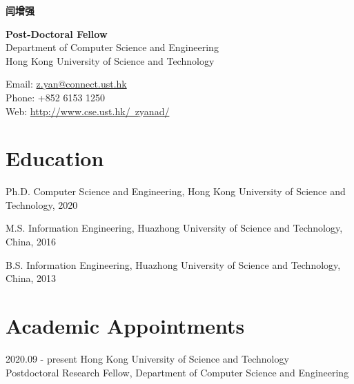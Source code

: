 \documentclass[12pt,letterpaper]{report}
\newcommand{\myname}{闫增强}
\newcommand{\namefont}[1]{{\normalfont\bfseries\Huge{#1}}}
\begin{document}
	\raggedright
	
	\namefont{\myname}
	
	\vspace{1em}
	\begin{minipage}[t]{0.6\textwidth}
		\textbf{Post-Doctoral Fellow}\\
		Department of Computer Science and Engineering \\
		Hong Kong University of Science and Technology
	\end{minipage}
	\begin{minipage}[t]{0.39\textwidth}
		Email: \href{mailto:z.yan@connect.ust.hk}{z.yan@connect.ust.hk} \\
		Phone: +852 6153 1250 \\
		Web: \href{http://www.cse.ust.hk/~zyanad/}{http://www.cse.ust.hk/~zyanad/}
	\end{minipage}
	\vspace{0.5em}
	
	
	
	\section{Education}
	
	\begin{tablist}
		
		\item[Ph.D.] \tab Computer Science and Engineering, Hong Kong University of Science and Technology, 2020
		
		\item[M.S.]  \tab Information Engineering, Huazhong University of Science and Technology, China, 2016
		
		\item[B.S.]  \tab Information Engineering, Huazhong University of Science and Technology, China, 2013
		
	\end{tablist}
	
	
	
	\section*{Academic Appointments}
	
	\begin{tablist}
		
		\item[2020.09 - present]   \tab Hong Kong University of Science and Technology \\
		\tab Postdoctoral Research Fellow, Department of Computer Science and Engineering
		
	\end{tablist}
	
\end{document}
